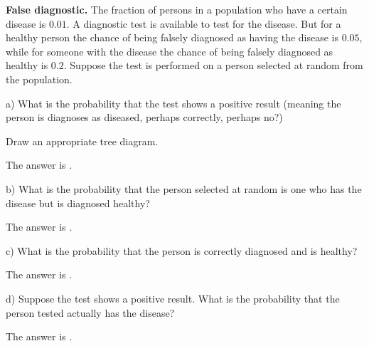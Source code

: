 \documentclass{ximera}
\begin{document}
\begin{question}
{\bf False diagnostic.} The fraction of persons in a population who have a certain disease is $0.01$. A diagnostic test is available to test for the disease. But for a healthy person the chance of being falsely diagnosed as having the disease is $0.05$, while for someone with the disease the chance of being falsely diagnosed as healthy is $0.2$. Suppose the test is performed on a person selected at random from the population.

a) What is the probability that the test shows a positive result (meaning the person is diagnoses as diseased, perhaps correctly, perhaps no?)
     \begin{solution}
          \begin{hint}
               Draw an appropriate tree diagram.
          \end{hint}
          The answer is  .
      \end{solution}

b) What is the probability that the person selected at random is one who has the disease but is diagnosed healthy?
     \begin{solution}
          The answer is .
      \end{solution}

c) What is the probability that the person is correctly diagnosed and is healthy?
     \begin{solution}
          The answer is .
      \end{solution}

d) Suppose the test shows a positive result. What is the probability that the person tested actually has the disease?
     \begin{solution}
          The answer is .
      \end{solution}
\end{question}
\end{document}
